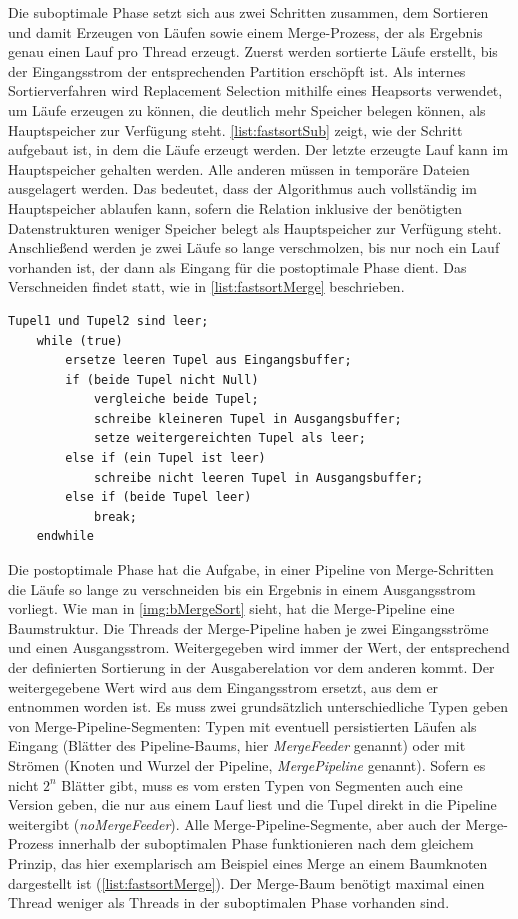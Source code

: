 \documentclass[a4paper,12pt,twoside]{article}
\newcommand{\Fb}[1]{\textit{#1}} %
\begin{document}
Die suboptimale Phase setzt sich aus zwei Schritten zusammen, dem Sortieren und damit Erzeugen von Läufen sowie einem Merge-Prozess, der als Ergebnis genau einen Lauf pro Thread erzeugt. Zuerst werden sortierte Läufe erstellt, bis der Eingangsstrom der entsprechenden Partition erschöpft ist. Als internes Sortierverfahren wird Replacement Selection mithilfe eines Heapsorts verwendet, um Läufe erzeugen zu können, die deutlich mehr Speicher belegen können, als Hauptspeicher zur Verfügung steht. \autoref{list:fastsortSub} zeigt, wie der Schritt aufgebaut ist, in dem die Läufe erzeugt werden. Der letzte erzeugte Lauf kann im Hauptspeicher gehalten werden. Alle anderen müssen in temporäre Dateien ausgelagert werden. Das bedeutet, dass der Algorithmus auch vollständig im Hauptspeicher ablaufen kann, sofern die Relation inklusive der benötigten Datenstrukturen weniger Speicher belegt als Hauptspeicher zur Verfügung steht. Anschließend werden je zwei Läufe so lange verschmolzen, bis nur noch ein Lauf vorhanden ist, der dann als Eingang für die postoptimale Phase dient. Das Verschneiden findet statt, wie in  \autoref{list:fastsortMerge} beschrieben.

\begin{minipage}{0.95\textwidth}
	\begin{lstlisting}[caption={Fastsort: Merge in Pipeline.}, label=list:fastsortMerge]
	Tupel1 und Tupel2 sind leer; 
	while (true)
		ersetze leeren Tupel aus Eingangsbuffer;
		if (beide Tupel nicht Null)
			vergleiche beide Tupel;
			schreibe kleineren Tupel in Ausgangsbuffer;
			setze weitergereichten Tupel als leer;
		else if (ein Tupel ist leer)
			schreibe nicht leeren Tupel in Ausgangsbuffer;
		else if (beide Tupel leer)
			break;
	endwhile
	\end{lstlisting}
\end{minipage}

Die postoptimale Phase hat die Aufgabe, in einer Pipeline von Merge-Schritten die Läufe so lange zu verschneiden bis ein Ergebnis in einem Ausgangsstrom vorliegt. Wie man in \autoref{img:bMergeSort} sieht, hat die Merge-Pipeline eine Baumstruktur. Die Threads der Merge-Pipeline haben je zwei Eingangsströme und einen Ausgangsstrom. Weitergegeben wird immer der Wert, der entsprechend der definierten Sortierung in der Ausgaberelation vor dem anderen kommt. Der weitergegebene Wert wird aus dem Eingangsstrom ersetzt, aus dem er entnommen worden ist. Es muss zwei grundsätzlich unterschiedliche Typen geben von Merge-Pipeline-Segmenten: Typen mit eventuell persistierten Läufen als Eingang (Blätter des Pipeline-Baums, hier \Fb{MergeFeeder} genannt) oder mit Strömen (Knoten und Wurzel der Pipeline, \Fb{MergePipeline} genannt). Sofern es nicht $2^n$ Blätter gibt, muss es vom ersten Typen von Segmenten auch eine Version geben, die nur aus einem Lauf liest und die Tupel direkt in die Pipeline weitergibt (\Fb{noMergeFeeder}). Alle Merge-Pipeline-Segmente, aber auch der Merge-Prozess innerhalb der suboptimalen Phase funktionieren nach dem gleichem Prinzip, das hier exemplarisch am Beispiel eines Merge an einem Baumknoten dargestellt ist (\autoref{list:fastsortMerge}). Der Merge-Baum benötigt maximal einen Thread weniger als Threads in der suboptimalen Phase vorhanden sind.
\end{document}
